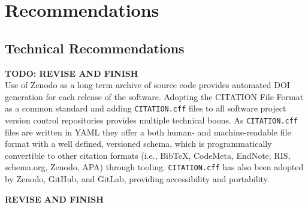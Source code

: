 \section{Recommendations}\label{sec:recommendations}

\subsection{Technical Recommendations}\label{sec:recommendations_technical}

\textbf{TODO: REVISE AND FINISH}\\
Use of Zenodo as a long term archive of source code provides automated DOI generation for each release of the software.
Adopting the CITATION File Format as a common standard and adding \texttt{CITATION.cff} files to all software project version control repositories provides multiple technical boons.
As \texttt{CITATION.cff} files are written in YAML they offer a both human- and machine-readable file format with a well defined, versioned schema, which is programmatically convertible to other citation formats (i.e., BibTeX, CodeMeta, EndNote, RIS, schema.org, Zenodo, APA) through tooling.
\texttt{CITATION.cff} has also been adopted by Zenodo, GitHub, and GitLab, providing accessibility and portability.

\textbf{REVISE AND FINISH}
